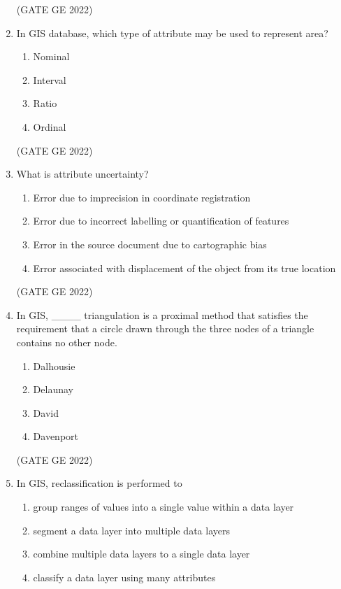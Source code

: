 \documentclass[a4paper, 11pt]{article}
\begin{document}
\begin{enumerate}
\hfill (GATE GE 2022)

\item In GIS database, which type of attribute may be used to represent area?
\begin{enumerate}
    \item Nominal
    \item Interval
    \item Ratio
    \item Ordinal
\end{enumerate}

\hfill (GATE GE 2022)

\item What is attribute uncertainty?
\begin{enumerate}
    \item Error due to imprecision in coordinate registration
    \item Error due to incorrect labelling or quantification of features
    \item Error in the source document due to cartographic bias
    \item Error associated with displacement of the object from its true location
\end{enumerate}

\hfill (GATE GE 2022)

\item In GIS, \_\_\_\_ triangulation is a proximal method that satisfies the requirement that a circle drawn through the three nodes of a triangle contains no other node.
\begin{enumerate}
    \item Dalhousie
    \item Delaunay
    \item David
    \item Davenport
\end{enumerate}

\hfill (GATE GE 2022)

\item In GIS, reclassification is performed to
\begin{enumerate}
    \item group ranges of values into a single value within a data layer
    \item segment a data layer into multiple data layers
    \item combine multiple data layers to a single data layer
    \item classify a data layer using many attributes
\end{enumerate}


\end{enumerate}
\end{document}
